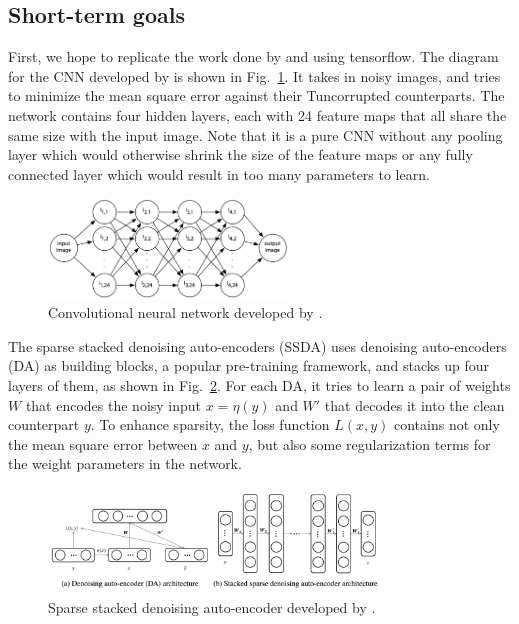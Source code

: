 \documentclass[11pt]{article}
\begin{document}
\subsection{Short-term goals}
First, we hope to replicate the work done by \cite{jain2009natural} and \cite{xie2012image} using tensorflow.
The diagram for the CNN developed by \cite{jain2009natural} is shown in Fig.~\ref{fig:CNN}.
It takes in noisy images, and tries to minimize the mean square error against their Tuncorrupted counterparts.
The network contains four hidden layers, each with 24 feature maps that all share the same size with the input image.
Note that it is a pure CNN without any pooling layer which would otherwise shrink the size of the feature maps or any fully connected layer which would result in too many parameters to learn.
\begin{figure}
  \centerline{\includegraphics[width=2.5in]{CNN}}
  \caption{Convolutional neural network developed by \cite{jain2009natural}.}
  \label{fig:CNN}
\end{figure}

The sparse stacked denoising auto-encoders (SSDA) uses denoising auto-encoders (DA) as building blocks, a popular pre-training framework, and stacks up four layers of them, as shown in Fig.~\ref{fig:SSDA}.
For each DA, it tries to learn a pair of weights $W$ that encodes the noisy input $x=\eta(y)$ and $W'$ that decodes it into the clean counterpart $y$.
To enhance sparsity, the loss function $L(x,y)$ contains not only the mean square error between $x$ and $y$, but also some regularization terms for the weight parameters in the network.

\begin{figure}
  \centerline{\includegraphics[width=3.5in]{SSDA}}
  \caption{Sparse stacked denoising auto-encoder developed by \cite{xie2012image}.}
  \label{fig:SSDA}
\end{figure}
\end{document}
